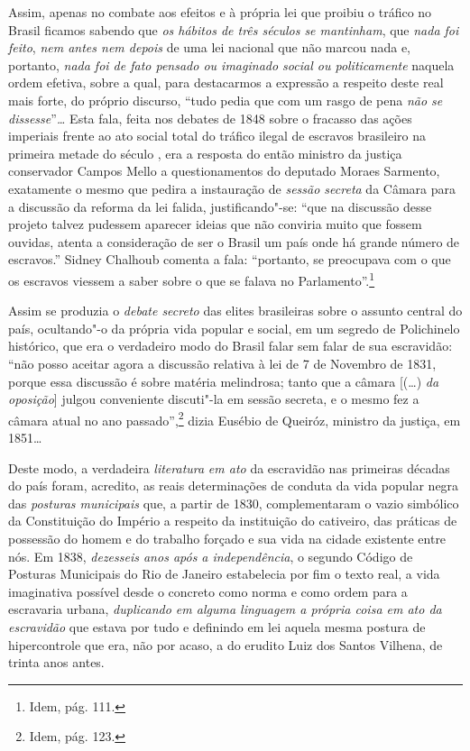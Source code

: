 Assim, apenas no combate aos efeitos e à própria lei que proibiu o
tráfico no Brasil ficamos sabendo que \emph{os hábitos de três séculos
se mantinham}, que \emph{nada foi feito}, \emph{nem antes nem depois} de
uma lei nacional que não marcou nada e, portanto, \emph{nada foi de fato
pensado ou imaginado social ou politicamente} naquela ordem efetiva,
sobre a qual, para destacarmos a expressão a respeito deste real mais
forte, do próprio discurso, ``tudo pedia que com um rasgo de pena
\emph{não se dissesse}''\emph{\ldots{}} Esta fala, feita nos debates de 1848
sobre o fracasso das ações imperiais frente ao ato social total do
tráfico ilegal de escravos brasileiro na primeira metade do século ,
era a resposta do então ministro da justiça conservador Campos Mello a
questionamentos do deputado Moraes Sarmento, exatamente o mesmo que
pedira a instauração de \emph{sessão secreta} da Câmara para a discussão
da reforma da lei falida, justificando"-se: ``que na discussão desse
projeto talvez pudessem aparecer ideias que não conviria muito que
fossem ouvidas, atenta a consideração de ser o Brasil um país onde há
grande número de escravos.'' Sidney Chalhoub comenta a fala: ``portanto,
se preocupava com o que os escravos viessem a saber sobre o que se
falava no Parlamento''.\footnote{Idem, pág. 111.}

Assim se produzia o \emph{debate secreto} das elites brasileiras sobre o
assunto central do país, ocultando"-o da própria vida popular e social,
em um segredo de Polichinelo histórico, que era o verdadeiro modo do
Brasil falar sem falar de sua escravidão: ``não posso aceitar agora a
discussão relativa à lei de 7 de Novembro de 1831, porque essa discussão
é sobre matéria melindrosa; tanto que a câmara {[}(\ldots{}) \emph{da
oposição}{]} julgou conveniente discuti"-la em sessão secreta, e o mesmo
fez a câmara atual no ano passado'',\footnote{Idem, pág. 123.} dizia
Eusébio de Queiróz, ministro da justiça, em 1851\ldots{}

Deste modo, a verdadeira \emph{literatura} \emph{em ato} da escravidão
nas primeiras décadas do país foram, acredito, as reais determinações de
conduta da vida popular negra das \emph{posturas municipais} que, a
partir de 1830, complementaram o vazio simbólico da Constituição do
Império a respeito da instituição do cativeiro, das práticas de
possessão do homem e do trabalho forçado e sua vida na cidade existente
entre nós. Em 1838, \emph{dezesseis anos após a independência}, o
segundo Código de Posturas Municipais do Rio de Janeiro estabelecia por
fim o texto real, a vida imaginativa possível desde o concreto como
norma e como ordem para a escravaria urbana, \emph{duplicando em alguma
linguagem a própria coisa em ato da escravidão} que estava por tudo e
definindo em lei aquela mesma postura de hipercontrole que era, não por
acaso, a do erudito Luiz dos Santos Vilhena, de trinta anos antes.

